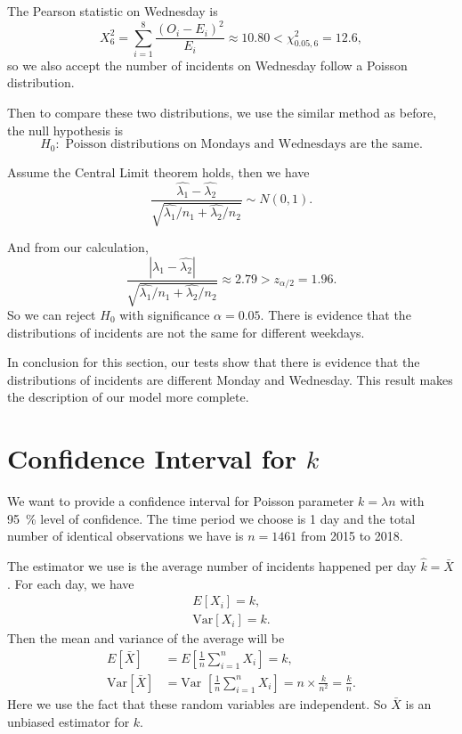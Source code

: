 \documentclass[11pt,a4paper,english]{article}
\begin{document}
The Pearson statistic on Wednesday is 
\begin{equation*}
	X^{2}_{6} = \sum_{i = 1}^{8}\frac{(O_{i}-E_{i})^{2}}{E_{i}} \approx 10.80 < \chi^{2}_{0.05,6} = 12.6,
\end{equation*}
so we also accept the number of incidents on Wednesday follow a Poisson distribution.

Then to compare these two distributions, we use the similar method as before, the null hypothesis is 
\begin{equation*}
	H_{0}:\text{ Poisson distributions on Mondays and Wednesdays are the same.}
\end{equation*}

Assume the Central Limit theorem holds, then we have
\begin{equation*}
	\frac{\hat{\lambda_{1}}-\hat{\lambda_{2}}}{\sqrt{\hat{\lambda_{1}}/{n_{1}} + \hat{\lambda_{2}}/{n_{2}}}} \sim N(0,1).
\end{equation*}

And from our calculation,
\begin{equation*}
	\frac{|\hat{\lambda_{1}}-\hat{\lambda_{2}}|}{\sqrt{\hat{\lambda_{1}}/{n_{1}} + \hat{\lambda_{2}}/{n_{2}}}} \approx 2.79 > z_{\alpha/2} = 1.96.
\end{equation*}
So we can reject $H_{0}$ with significance $\alpha = 0.05$. There is evidence that the distributions of incidents are not the same for different weekdays.

In conclusion for this section, our tests show that there is evidence that the distributions of incidents are different Monday and Wednesday. This result makes the description of our model more complete.
\section{Confidence Interval for $k$}
We want to provide a confidence interval for Poisson parameter $k = \lambda n$ with \SI{95}{\percent} level of confidence. 
The time period we choose is 1 day and the total number of identical observations we have is $n = 1461$ from 2015 to 2018.

The estimator we use is the average number of incidents happened per day $\hat{k} = \bar{X}$.
For each day, we have 
\begin{align*}
	E[X_{i}] = k,\\
	\text{Var}[X_{i}] = k.
\end{align*}
Then the mean and variance of the average will be
\begin{align*}
	E[\bar{X}] &= E[\frac{1}{n}\sum_{i = 1}^{n}X_{i}] = k,\\
	\text{Var}[\bar{X}] &= \text{Var }[\frac{1}{n}\sum_{i = 1}^{n}X_{i}] = n \times \frac{k}{n^{2}} = \frac{k}{n}.
\end{align*}
Here we use the fact that these random variables are independent. So $\bar{X}$ is an unbiased estimator for $k$.
\end{document}

